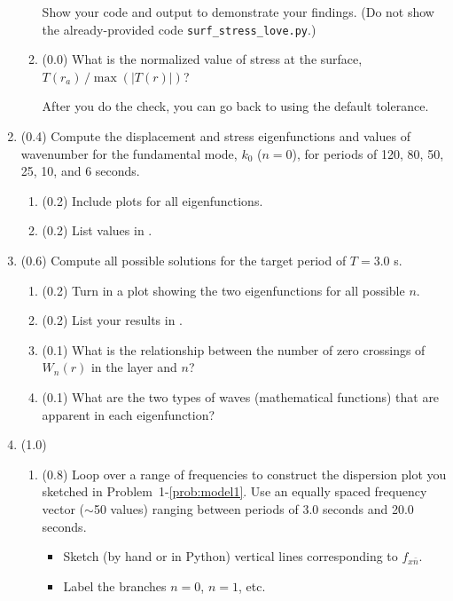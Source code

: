 \documentclass[11pt,titlepage,fleqn]{article}
\newcommand{\cutoff}[1]{{#1}_{x\bar{n}}}
\newcommand{\tfileBB}{{\tt surf\_stress\_love.py}}
\begin{document}
\begin{enumerate}
\begin{enumerate}
Show your code and output to demonstrate your findings.
(Do not show the already-provided code \tfileBB.)

\item (0.0) What is the normalized value of stress at the surface, $T(r_a)\,/\max(|T(r)|)$?

After you do the check, you can go back to using the default tolerance.
\end{enumerate}


\item (0.4) Compute the displacement and stress eigenfunctions and values of wavenumber for the fundamental mode, $k_0$ ($n=0$), for periods of 120, 80, 50, 25, 10, and 6 seconds.

\begin{enumerate}
\item (0.2) Include plots for all eigenfunctions.
\item (0.2) List values in .
\end{enumerate}


\item (0.6) Compute all possible solutions for the target period of $T = 3.0$ s.
%
\begin{enumerate}
\item (0.2) Turn in a plot showing the two eigenfunctions for all possible $n$.

\item (0.2) List your results in .

\item (0.1) What is the relationship between the number of zero crossings of $W_n(r)$ in the layer and $n$?
\item (0.1) What are the two types of waves (\ie mathematical functions) that are apparent in each eigenfunction?
\end{enumerate}


\pagebreak
\item (1.0)
\begin{enumerate}
\item (0.8) Loop over a range of frequencies to construct the dispersion plot you sketched in Problem~1-\ref{prob:model1}. Use an equally spaced frequency vector ($\sim$50 values) ranging between periods of 3.0 seconds and 20.0 seconds.
%
\begin{itemize}
\item Sketch (by hand or in Python) vertical lines corresponding to $\cutoff{f}$.
\item Label the branches $n=0$, $n=1$, etc.
\end{itemize}


\end{enumerate}
\end{enumerate}
\end{document}
